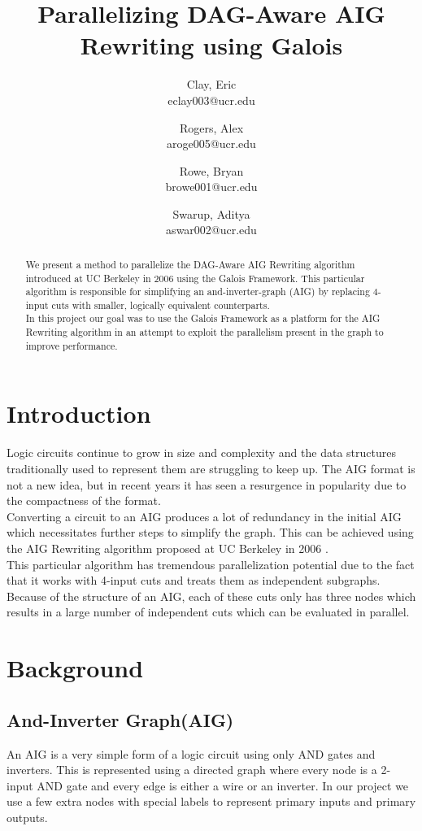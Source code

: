 \documentclass[twocolumn]{article}
\title{\huge{Parallelizing DAG-Aware AIG Rewriting using Galois}}
\date{\vspace{-5ex}}
\author{
  Clay, Eric\\
  eclay003@ucr.edu
  \and
  Rogers, Alex\\
  aroge005@ucr.edu
  \and
  Rowe, Bryan\\
  browe001@ucr.edu
  \and
  Swarup, Aditya\\
  aswar002@ucr.edu
}
\begin{document}
\maketitle

\begin{abstract}
We present a method to parallelize the DAG-Aware AIG Rewriting algorithm introduced at UC Berkeley in 2006 \cite{DAG} using the Galois Framework\cite{GALOIS}.  This particular algorithm is responsible for simplifying an and-inverter-graph (AIG) by replacing 4-input cuts with smaller, logically equivalent counterparts.  \\\indent
In this project our goal was to use the Galois Framework\cite{GALOIS} as a platform for the AIG Rewriting algorithm in an attempt to exploit the parallelism present in the graph to improve performance.
\end{abstract}

\section{Introduction}
Logic circuits continue to grow in size and complexity and the data structures traditionally used to represent them are struggling to keep up. The AIG format is not a new idea, but in recent years it has seen a resurgence in popularity due to the compactness of the format.\\\indent
Converting a circuit to an AIG produces a lot of redundancy in the initial AIG which necessitates further steps to simplify the graph. This can be achieved using the AIG Rewriting algorithm proposed at UC Berkeley in 2006 \cite{DAG}.  \\\indent
This particular algorithm has tremendous parallelization potential due to the fact that it works with 4-input cuts and treats them as independent subgraphs. Because of the structure of an AIG, each of these cuts only has three nodes which results in a large number of independent cuts which can be evaluated in parallel.

\section{Background}
\subsection{And-Inverter Graph(AIG)}
An AIG is a very simple form of a logic circuit using only AND gates and inverters. This is represented using a directed graph where every node is a 2-input AND gate and every edge is either a wire or an inverter. In our project we use a few extra nodes with special labels to represent primary inputs and primary outputs.
\end{document}
